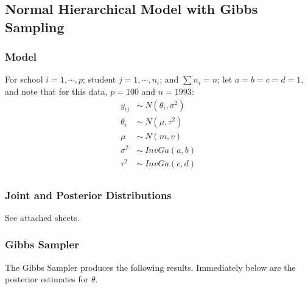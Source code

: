 \documentclass[12pt,letterpaper]{article}\usepackage[]{graphicx}\usepackage[]{color}
\begin{document}
\subsection{Normal Hierarchical Model with Gibbs Sampling}

\subsubsection{Model}
For school $i=1,\cdots,p$; student $j=1,\cdots,n_i$; and $\sum n_i = n$; 
let $a=b=c=d=1$, and note that for this data, $p=100$ and $n=1993$:
\begin{align*}
  y_{ij} &\sim\ N(\theta_i,\sigma^2)\\
  \theta_i &\sim\ N(\mu,\tau^2)\\
  \mu &\sim\ N(m, v)\\
  \sigma^2 &\sim\ InvGa(a,b)\\
  \tau^2 &\sim\ InvGa(c,d)\\
\end{align*}

\subsubsection{Joint and Posterior Distributions}

See attached sheets.

\subsubsection{Gibbs Sampler}

The Gibbs Sampler produces the following results. Immediately below are the posterior estimates for $\theta$.
\end{document}
